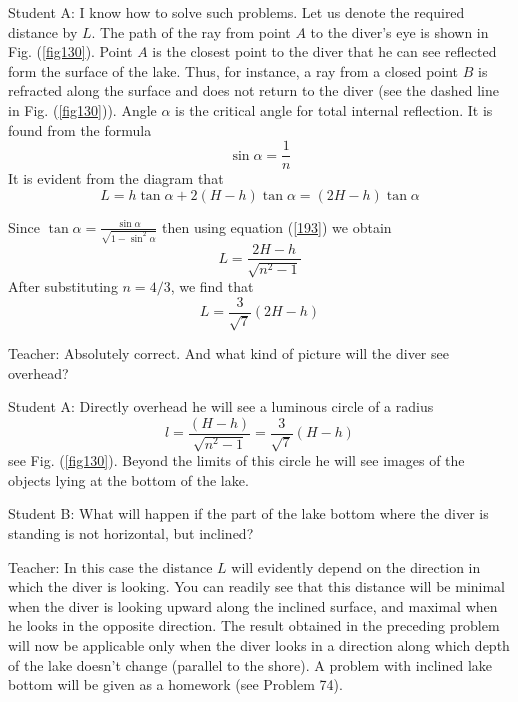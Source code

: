 \documentclass[a4paper,12pt]{book}
\begin{document}
{{\sc Student A:} I know how to solve such problems. Let us denote the required distance by $L$. The path of the ray from point $A$ to the diver's eye is shown in Fig. (\ref{fig130}). Point $A$ is the closest point to the diver that he can see reflected form the surface of the lake. Thus, for instance, a ray from a closed point $B$ is refracted along the surface and does not return to the diver (see the dashed line in Fig. (\ref{fig130})). Angle $\alpha $ is the critical angle for total internal reflection. It is found from the formula 
\begin{equation}
\sin \alpha = \frac{1}{n} \label{193}
\end{equation}
 It is evident from the diagram that 
 \begin{equation*}
L = h \tan \alpha + 2 (H - h) \tan \alpha = (2H -h) \tan \alpha
 \end{equation*}
 
 Since $\tan \alpha = \frac{\sin \alpha}{ \sqrt{1 - \sin^{2} \alpha}}$ then using equation (\ref{193}) we obtain
 \begin{equation}
L = \frac{2H - h}{\sqrt{n^{2}-1}}
\end{equation}
After substituting $n=4/3$, we find that
\begin{equation*}
L = \frac{3}{\sqrt{7}}(2H -h)
\end{equation*}

{\sc Teacher:} Absolutely correct. And what kind of picture will the diver see overhead?

{\sc Student A:} Directly overhead he will see a luminous circle of a radius 
\begin{equation*}
l = \frac{(H-h)}{\sqrt{n^{2}-1}} = \frac{3}{\sqrt{7}} (H-h)
\end{equation*}
see Fig. (\ref{fig130}). Beyond the limits of this circle he will see images of the objects lying at the bottom of the lake.

{\sc Student B:} What will happen if the part of the lake bottom where the diver is standing is not horizontal, but inclined?

{\sc Teacher:} In this case the distance $L$ will evidently depend on the direction in which the diver is looking. You can readily see that this distance will be minimal when the diver is looking upward along the inclined surface, and maximal when he looks in the opposite direction. The result obtained in the preceding problem will now be applicable only when the diver looks in a direction along which depth of the lake doesn't change (parallel to the shore). A problem with inclined lake bottom will be given as a homework (see Problem 74).

}
\end{document}
